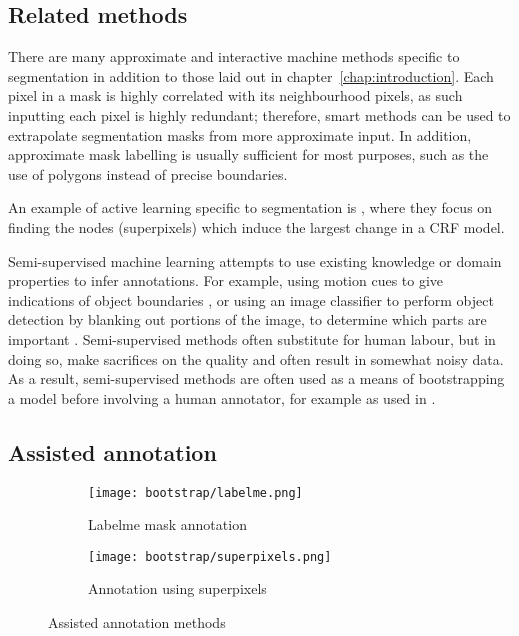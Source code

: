 \subsection{Related methods}

There are many approximate and interactive machine methods specific to segmentation in addition to those laid out in chapter~\ref{chap:introduction}. Each pixel in a mask is highly correlated with its neighbourhood pixels, as such inputting each pixel is highly redundant; therefore, smart methods can be used to extrapolate segmentation masks from more approximate input. In addition, approximate mask labelling is usually sufficient for most purposes, such as the use of polygons instead of precise boundaries.

An example of active learning specific to segmentation is \cite{Xu2017}, where they focus on finding the nodes (superpixels) which induce the largest change in a \gls{CRF} model.

Semi-supervised machine learning attempts to use existing knowledge or domain properties to infer annotations. For example, using motion cues to give indications of object boundaries \cite{Hong2017}, or using an image classifier to perform object detection by blanking out portions of the image, to determine which parts are important \cite{Bazzani2016}. Semi-supervised methods often substitute for human labour, but in doing so, make sacrifices on the quality and often result in somewhat noisy data. As a result, semi-supervised methods are often used as a means of bootstrapping a model before involving a human annotator, for example as used in \cite{Papadopoulos2016}.


\subsection {Assisted annotation}


\begin{figure}[ht]
\centering
\begin{subfigure}{.5\textwidth}
  \centering
  \texttt{[image: bootstrap/labelme.png]}
  \caption{Labelme mask annotation}  
  \label{fig:bootstrap_labelme}
\end{subfigure}%
\begin{subfigure}{.5\textwidth}
  \centering
  \texttt{[image: bootstrap/superpixels.png]}
  \caption{Annotation using superpixels}
  \label{fig:bootstrap_superpixels}
\end{subfigure}

\caption{Assisted annotation methods}
\label{fig:bootstrap_annot_method}
\end{figure}


